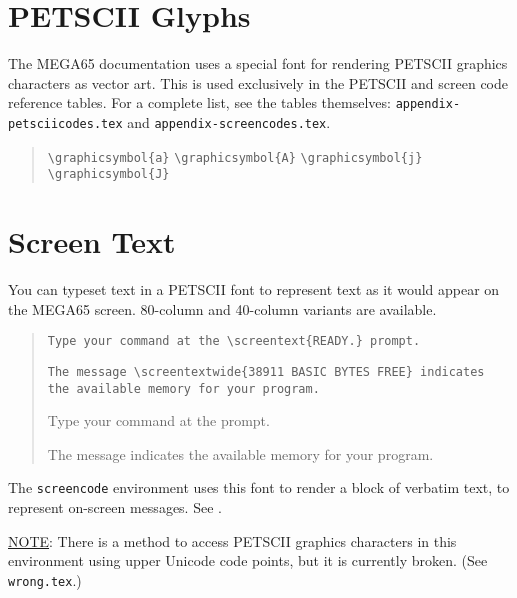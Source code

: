 \section{PETSCII Glyphs}

The MEGA65 documentation uses a special font for rendering PETSCII graphics characters as vector art. This is used exclusively in the PETSCII and screen code reference tables. For a complete list, see the tables themselves: \texttt{appendix-petsciicodes.tex} and \texttt{appendix-screencodes.tex}.

\begin{quote}

\texttt{{\textbackslash}graphicsymbol\{a\}}
\texttt{{\textbackslash}graphicsymbol\{A\}}
\texttt{{\textbackslash}graphicsymbol\{j\}}
\texttt{{\textbackslash}graphicsymbol\{J\}}

\hrulefill


\end{quote}

\section{Screen Text}

You can typeset text in a PETSCII font to represent text as it would appear on the MEGA65 screen. 80-column and 40-column variants are available.

\begin{quote}
    \texttt{Type your command at the {\textbackslash}screentext\{READY.\} prompt.}

    \texttt{The message {\textbackslash}screentextwide\{38911 BASIC BYTES FREE\} indicates the available memory for your program.}

    \hrulefill

    Type your command at the  prompt.

    The message  indicates the available memory for your program.

\end{quote}

The \texttt{screencode} environment uses this font to render a block of verbatim text, to represent on-screen messages. See .

\underline{NOTE}: There is a method to access PETSCII graphics characters in this environment using upper Unicode code points, but it is currently broken. (See \texttt{wrong.tex}.)

